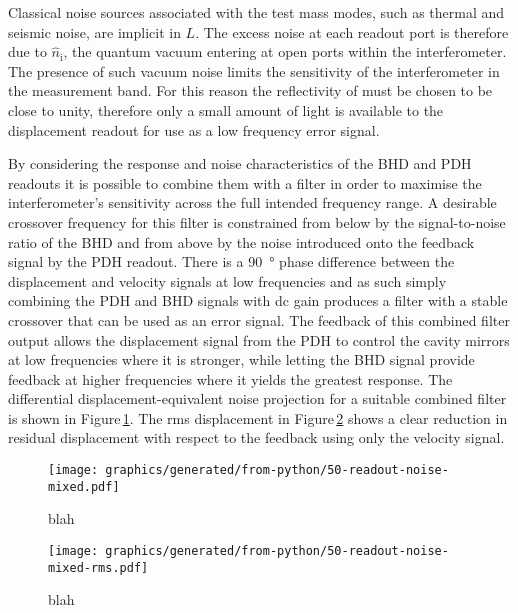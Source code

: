 Classical noise sources associated with the test mass modes, such as thermal and seismic noise, are implicit in $L$. The excess noise at each readout port is therefore due to $\hat{n}_{\textrm{i}}$, the quantum vacuum entering at open ports within the interferometer. The presence of such vacuum noise limits the sensitivity of the interferometer in the measurement band. For this reason the reflectivity of \MINT{} must be chosen to be close to unity, therefore only a small amount of light is available to the displacement readout for use as a low frequency error signal.

By considering the response and noise characteristics of the \gls{BHD} and \gls{PDH} readouts it is possible to combine them with a filter in order to maximise the interferometer's sensitivity across the full intended frequency range. A desirable crossover frequency for this filter is constrained from below by the signal-to-noise ratio of the \gls{BHD} and from above by the noise introduced onto the feedback signal by the \gls{PDH} readout. There is a \SI{90}{\degree} phase difference between the displacement and velocity signals at low frequencies and as such simply combining the \gls{PDH} and \gls{BHD} signals with dc gain produces a filter with a stable crossover that can be used as an error signal. The feedback of this combined filter output allows the displacement signal from the \gls{PDH} to control the cavity mirrors at low frequencies where it is stronger, while letting the \gls{BHD} signal provide feedback at higher frequencies where it yields the greatest response. The differential displacement-equivalent noise projection for a suitable combined filter is shown in Figure\,\ref{fig:readout-noise-mixed}. The rms displacement in Figure\,\ref{fig:readout-noise-mixed-rms} shows a clear reduction in residual displacement with respect to the feedback using only the velocity signal.

\begin{figure}
  \centering
  \texttt{[image: graphics/generated/from-python/50-readout-noise-mixed.pdf]}
  \caption[Noise projection for \LMINUS{} using both displacement and velocity feedback]{\label{fig:readout-noise-mixed}blah}
\end{figure}

\begin{figure}
  \centering
  \texttt{[image: graphics/generated/from-python/50-readout-noise-mixed-rms.pdf]}
  \caption[Root-mean-square noise projection for \LMINUS{} using both displacement and velocity feedback]{\label{fig:readout-noise-mixed-rms}blah}
\end{figure}

